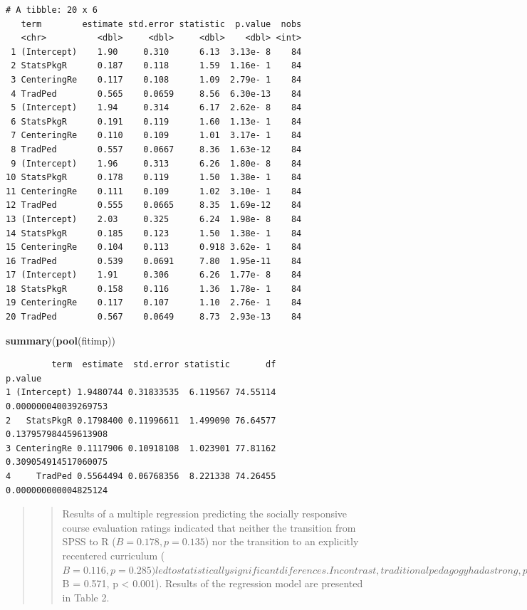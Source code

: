 \documentclass[
  11pt,
]{book}
\newenvironment{Shaded}{\begin{snugshade}}{\end{snugshade}}
\newcommand{\FunctionTok}[1]{\textcolor[rgb]{0.27,0.27,0.27}{\textbf{#1}}}
\newcommand{\NormalTok}[1]{#1}
\begin{document}
\begin{verbatim}
# A tibble: 20 x 6
   term        estimate std.error statistic  p.value  nobs
   <chr>          <dbl>     <dbl>     <dbl>    <dbl> <int>
 1 (Intercept)    1.90     0.310      6.13  3.13e- 8    84
 2 StatsPkgR      0.187    0.118      1.59  1.16e- 1    84
 3 CenteringRe    0.117    0.108      1.09  2.79e- 1    84
 4 TradPed        0.565    0.0659     8.56  6.30e-13    84
 5 (Intercept)    1.94     0.314      6.17  2.62e- 8    84
 6 StatsPkgR      0.191    0.119      1.60  1.13e- 1    84
 7 CenteringRe    0.110    0.109      1.01  3.17e- 1    84
 8 TradPed        0.557    0.0667     8.36  1.63e-12    84
 9 (Intercept)    1.96     0.313      6.26  1.80e- 8    84
10 StatsPkgR      0.178    0.119      1.50  1.38e- 1    84
11 CenteringRe    0.111    0.109      1.02  3.10e- 1    84
12 TradPed        0.555    0.0665     8.35  1.69e-12    84
13 (Intercept)    2.03     0.325      6.24  1.98e- 8    84
14 StatsPkgR      0.185    0.123      1.50  1.38e- 1    84
15 CenteringRe    0.104    0.113      0.918 3.62e- 1    84
16 TradPed        0.539    0.0691     7.80  1.95e-11    84
17 (Intercept)    1.91     0.306      6.26  1.77e- 8    84
18 StatsPkgR      0.158    0.116      1.36  1.78e- 1    84
19 CenteringRe    0.117    0.107      1.10  2.76e- 1    84
20 TradPed        0.567    0.0649     8.73  2.93e-13    84
\end{verbatim}

\begin{Shaded}
\begin{Highlighting}[]
\FunctionTok{summary}\NormalTok{(}\FunctionTok{pool}\NormalTok{(fitimp))}
\end{Highlighting}
\end{Shaded}

\begin{verbatim}
         term  estimate  std.error statistic       df              p.value
1 (Intercept) 1.9480744 0.31833535  6.119567 74.55114 0.000000040039269753
2   StatsPkgR 0.1798400 0.11996611  1.499090 76.64577 0.137957984459613908
3 CenteringRe 0.1117906 0.10918108  1.023901 77.81162 0.309054914517060075
4     TradPed 0.5564494 0.06768356  8.221338 74.26455 0.000000000004825124
\end{verbatim}

\begin{quote}
\begin{quote}
Results of a multiple regression predicting the socially responsive course evaluation ratings indicated that neither the transition from SPSS to R (\(B = 0.178, p = 0.135\)) nor the transition to an explicitly recentered curriculum (\(B = 0.116, p = 0.285) led to statistically significant diferences. In contrast, traditional pedagogy had a strong, positive effect on evaluations of socially responsive pedagogy (\)B = 0.571, p \textless{} 0.001). Results of the regression model are presented in Table 2.
\end{quote}
\end{quote}
\end{document}
